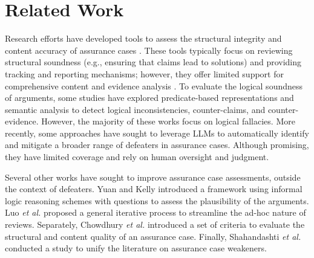 \section{Related Work}
\label{sec:related}

Research efforts have developed tools to assess the structural integrity and content accuracy of assurance cases \cite{maksimov2019survey,10311213}. These tools typically focus on reviewing structural soundness (e.g., ensuring that claims lead to solutions) and providing tracking and reporting mechanisms; however, they offer limited support for comprehensive content and evidence analysis \cite{maksimov2019survey}. To evaluate the logical soundness of arguments, some studies \cite{murugesan2023semantic,muram2023attest, yuan2016automatically,rushby2015understanding} have explored predicate-based representations and semantic analysis to detect logical inconsistencies, counter-claims, and counter-evidence.
However, the majority of these works focus on logical fallacies.
More recently, some approaches \cite{gohar2024codefeater,AISupported} have sought to leverage LLMs to automatically identify and mitigate a broader range of defeaters in assurance cases. Although promising, they have limited coverage and rely on human oversight and judgment.

Several other works have sought to improve assurance case assessments, outside the context of defeaters. Yuan and Kelly \cite{yuan2012argument} introduced a framework using informal logic reasoning schemes with questions to assess the plausibility of the arguments. Luo \MakeLowercase{\textit{et al.}} \cite{luo2017systematic} proposed a general iterative process to streamline the ad-hoc nature of reviews. Separately, Chowdhury \MakeLowercase{\textit{et al.}} \cite{chowdhury2020systematic} introduced a set of criteria to evaluate the structural and content quality of an assurance case. Finally, Shahandashti \MakeLowercase{\textit{et al.}} \cite{shahandashti2024prisma} conducted a study to unify the literature on assurance case weakeners.